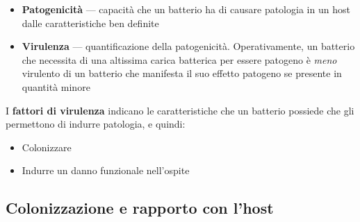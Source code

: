 \documentclass[italian,]{article}
\providecommand{\tightlist}{%
  \setlength{\itemsep}{0pt}\setlength{\parskip}{0pt}}
\newcommand{\normalbox}[2]{\begin{tcolorbox}[title=#1]#2\end{tcolorbox}} %
\begin{document}
\normalbox{Patogenicità vs virulenza, label=lblboxpato}{
\begin{itemize} \tightlist
\item \textbf{Patogenicità} --- capacità che un batterio ha di causare patologia in un host dalle caratteristiche ben definite
\item \textbf{Virulenza} --- quantificazione della patogenicità. Operativamente, un batterio che necessita di una altissima carica batterica per essere patogeno è \emph{meno} virulento di un batterio che manifesta il suo effetto patogeno se presente in quantità minore
\end{itemize}
\tcblower
I \textbf{fattori di virulenza} indicano le caratteristiche che un batterio possiede che gli permettono di indurre patologia, e quindi:
\begin{itemize} \tightlist
\item Colonizzare
\item Indurre un danno funzionale nell'ospite
\end{itemize}
}

\hypertarget{colonizzazione-e-rapporto-con-lhost}{%
\subsection{Colonizzazione e rapporto con
l'host}\label{colonizzazione-e-rapporto-con-lhost}}
\end{document}
